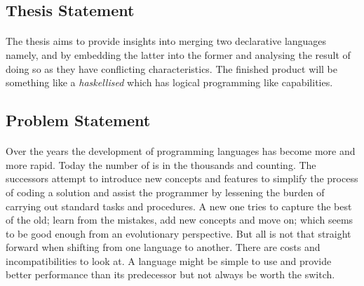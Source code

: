 \documentclass[proposal.tex]{subfiles}
\begin{document}
\subsection{Thesis Statement}
\paragraph{} 
The thesis aims to provide insights into merging two declarative languages namely,  and  by embedding the latter 
into the former and analysing the result of doing so as they have conflicting characteristics. The finished product will be something like a \textit{haskellised}
  which has logical programming like capabilities.       


\subsection{Problem Statement}

\paragraph{}
Over the years the development of programming languages has become more and more rapid. Today the number of is in the thousands and counting. The 
successors attempt to introduce new concepts and features to simplify the process of coding a solution and assist the programmer by lessening the 
burden of carrying out standard tasks and procedures. A new one tries to capture the best of the old; learn from the mistakes, add new concepts and 
move on; which seems to be good enough from an evolutionary perspective. But all is not that straight forward when shifting from one language 
to another. There are costs and incompatibilities to look at. A language might be simple to use and provide better performance than its 
predecessor but not always be worth the switch.
\end{document}
